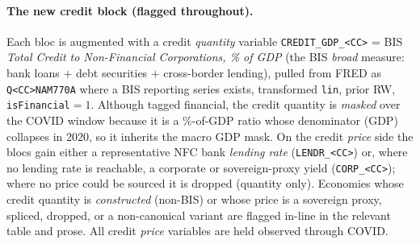 \paragraph{The new credit block (flagged throughout).} Each bloc is augmented
with a credit \emph{quantity} variable \texttt{CREDIT\_GDP\_<CC>} = BIS
\emph{Total Credit to Non-Financial Corporations, \% of GDP} (the BIS
\emph{broad} measure: bank loans $+$ debt securities $+$ cross-border
lending), pulled from FRED as \texttt{Q<CC>NAM770A} where a BIS reporting
series exists, transformed \texttt{lin}, prior RW, \texttt{isFinancial}$=1$.
Although tagged financial, the credit quantity is \emph{masked} over the COVID
window because it is a \%-of-GDP ratio whose denominator (GDP) collapses in
2020, so it inherits the macro GDP mask. On the credit \emph{price} side the
blocs gain either a representative NFC bank \emph{lending rate}
(\texttt{LENDR\_<CC>}) or, where no lending rate is reachable, a corporate or
sovereign-proxy yield (\texttt{CORP\_<CC>}); where no price could be sourced it
is dropped (quantity only). Economies whose credit quantity is
\emph{constructed} (non-BIS) or whose price is a sovereign proxy, spliced,
dropped, or a non-canonical variant are flagged in-line in the relevant table
and prose. All credit \emph{price} variables are held observed through COVID.



